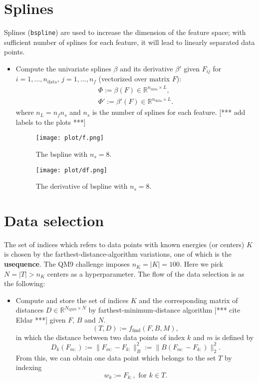 \documentclass[12pt]{article}
\def\att{                    %
        \marginpar[ \hspace*{\fill} \raisebox{-0.2em}{\rule{2mm}{1.2em}} ]
        {\raisebox{-0.2em}{\rule{2mm}{1.2em}} }
        }
\def\at#1{[*** \att #1 ***]}  %
\begin{document}
\section{Splines}
\label{sec:spline}
Splines (\texttt{bspline}) are used to increase the dimension of the feature space; with sufficient number of splines for each feature, it will lead to linearly separated data points.
\begin{itemize}
	\item Compute the univariate splines $\beta$ and its derivative $\beta'$ given $F_{ij}$ for $i = 1,...,n_\text{data}$, $j = 1,...,n_f$ (vectorized over matrix $F$):
	\begin{equation}
		\label{eq:spline}
		\begin{split}
			\Phi := \beta(F) \in \mathbb{R}^{n_\text{data} \times L}, \\
			\Phi' := \beta'(F) \in \mathbb{R}^{n_\text{data} \times L}.
		\end{split}
	\end{equation}
	where $n_L = n_fn_s$ and $n_s$ is the number of splines for each feature.
	\at{add labels to the plots}
	\begin{figure}[h]
		\label{fig:spline}
		\centering
		\texttt{[image: plot/f.png]}
		\caption{The bspline with $n_s = 8$.}
	\end{figure}
	\begin{figure}[H]
		\label{fig:dspline}
		\centering
		\texttt{[image: plot/df.png]}
		\caption{The derivative of bspline with $n_s = 8$.}
	\end{figure}
\end{itemize}



\section{Data selection}
\label{sec:data}
The set of indices which refers to data points with known energies (or centers) $K$ is chosen by the farthest-distance-algorithm variations, one of which is the \textbf{usequence}. The QM9 challenge imposes $n_K = |K| = 100$. Here we pick $N = |T| > n_K$ centers as a hyperparameter. The flow of the data selection is as the following:
\begin{itemize}
	\item Compute and store the set of indices $K$ and the corresponding matrix of distances $D \in \mathbb{R}^{N_\text{QM9} \times N}$ by farthest-minimum-distance algorithm \at{cite Eldar} given $F$, $B$ and $N$.
	\begin{equation}
		(T, D) := f_{\text{fmd}}(F, B, M),
	\end{equation}
	in which the distance between two data points of index $k$ and $m$ is defined by
	\begin{equation}
		D_k(F_{m:}) := \|F_{m:} - F_{k:}\|^2_B := \|B(F_{m:} - F_{k:})\|^2_2.
	\end{equation}
	From this, we can obtain one data point which belongs to the set $T$ by indexing
	\begin{equation}
		w_k := F_{k:}, \text{ for } k \in T.
	\end{equation}
\end{itemize}
\end{document}
